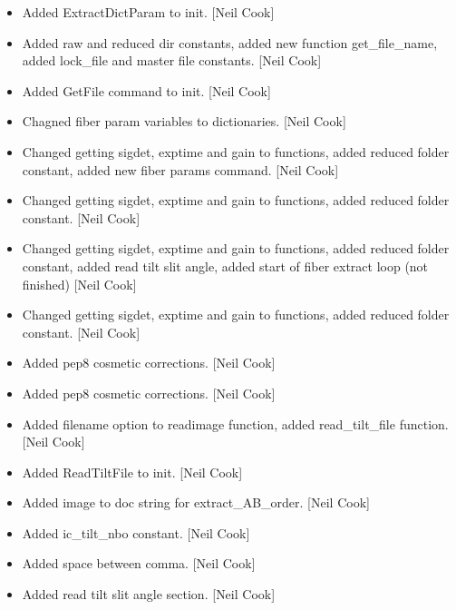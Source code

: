 \documentclass[a4paper,10pt,english]{report}
\begin{document}
\begin{itemize}
\item {} 
Added ExtractDictParam to init. {[}Neil Cook{]}

\item {} 
Added raw and reduced dir constants, added new function get\_file\_name,
added lock\_file and master file constants. {[}Neil Cook{]}

\item {} 
Added GetFile command to init. {[}Neil Cook{]}

\item {} 
Chagned fiber param variables to dictionaries. {[}Neil Cook{]}

\item {} 
Changed getting sigdet, exptime and gain to functions, added reduced
folder constant, added new fiber params command. {[}Neil Cook{]}

\item {} 
Changed getting sigdet, exptime and gain to functions, added reduced
folder constant. {[}Neil Cook{]}

\item {} 
Changed getting sigdet, exptime and gain to functions, added reduced
folder constant, added read tilt slit angle, added start of fiber
extract loop (not finished) {[}Neil Cook{]}

\item {} 
Changed getting sigdet, exptime and gain to functions, added reduced
folder constant. {[}Neil Cook{]}

\item {} 
Added pep8 cosmetic corrections. {[}Neil Cook{]}

\item {} 
Added pep8 cosmetic corrections. {[}Neil Cook{]}

\item {} 
Added filename option to readimage function, added read\_tilt\_file
function. {[}Neil Cook{]}

\item {} 
Added ReadTiltFile to init. {[}Neil Cook{]}

\item {} 
Added image to doc string for extract\_AB\_order. {[}Neil Cook{]}

\item {} 
Added ic\_tilt\_nbo constant. {[}Neil Cook{]}

\item {} 
Added space between comma. {[}Neil Cook{]}

\item {} 
Added read tilt slit angle section. {[}Neil Cook{]}

\end{itemize}
\end{document}
